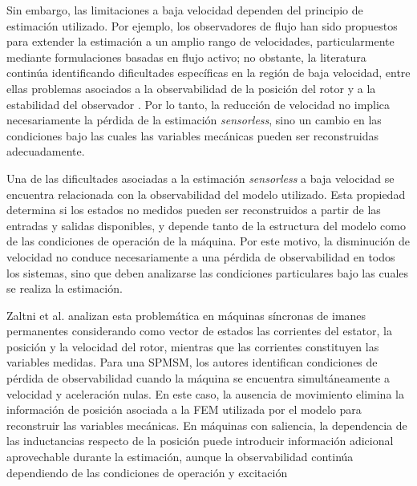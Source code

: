 Sin embargo, las limitaciones a baja velocidad dependen del principio de estimación utilizado. Por ejemplo, los observadores de flujo han sido propuestos para extender la estimación a un amplio rango de velocidades, particularmente mediante formulaciones basadas en flujo activo; no obstante, la literatura continúa identificando dificultades específicas en la región de baja velocidad, entre ellas problemas asociados a la observabilidad de la posición del rotor y a la estabilidad del observador \cite{wangParameterRobustnessImprovement2026}. Por lo tanto, la reducción de velocidad no implica necesariamente la pérdida de la estimación \textit{sensorless}, sino un cambio en las condiciones bajo las cuales las variables mecánicas pueden ser reconstruidas adecuadamente.
%
%
%
%
%
%
%

Una de las dificultades asociadas a la estimación \textit{sensorless} a baja velocidad se encuentra relacionada con la observabilidad del modelo utilizado. Esta propiedad determina si los estados no medidos pueden ser reconstruidos a partir de las entradas y salidas disponibles, y depende tanto de la estructura del modelo como de las condiciones de operación de la máquina. Por este motivo, la disminución de velocidad no conduce necesariamente a una pérdida de observabilidad en todos los sistemas, sino que deben analizarse las condiciones particulares bajo las cuales se realiza la estimación.

Zaltni et al. \cite{zaltniObservabilityAnalysisPMSM2009} analizan esta problemática en máquinas síncronas de imanes permanentes considerando como vector de estados las corrientes del estator, la posición y la velocidad del rotor, mientras que las corrientes constituyen las variables medidas. Para una SPMSM, los autores identifican condiciones de pérdida de observabilidad cuando la máquina se encuentra simultáneamente a velocidad y aceleración nulas. En este caso, la ausencia de movimiento elimina la información de posición asociada a la FEM utilizada por el modelo para reconstruir las variables mecánicas. En máquinas con saliencia, la dependencia de las inductancias respecto de la posición puede introducir información adicional aprovechable durante la estimación, aunque la observabilidad continúa dependiendo de las condiciones de operación y excitación

